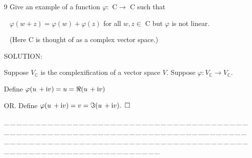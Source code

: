 \documentclass[a4paper, 11pt, UTF8]{article}
\def\i{\textup{i}}
\begin{document}
\begin{large}
{\timesbf\Large 9} {\timessl\Large 
Give an example of a function $\varphi:$ {\timesbf C}$\rightarrow$ {\timesbf C} such that}\par\,\,\,
{\timessl\Large
 $\varphi(w + z) = \varphi(w) + \varphi(z)$ for all $w, z\in$ {\timesbf C} but $\varphi$ is not linear.}\par\,\,\,
{\timessl (Here {\timesbf C} is thought of as a complex vector space.)
}\par
{\timesbf S\footnotesize{OLUTION:}}\par\quad
Suppose $V_\mathbb{C}$ is the complexification of a vector space $V$. Suppose $\varphi:V_\mathbb{C}\rightarrow V_\mathbb{C}.$\par\quad
Define $\varphi(u\,+\i v)=u=\Re(u\,+\i v)$\par\quad
O{\small R}. Define $\varphi(u\,+\i v)=v=\Im(u\,+\i v).\,\,\,\square$\par
{\tiny \_\,\_\,\_\,\_\,\_\,\_\,\_\,\_\,\_\,\_\,\_\,\_\,\_\,\_\,\_\,\_\,\_\,\_\,\_\,\_\,\_\,\_\,\_\,\_\,\_\,\_\,\_\,\_\,\_\,\_\,\_\,\_\,\_\,\_\,\_\,\_\,\_\,\_\,\_\,\_\,\_\,\_\,\_\,\_\,\_\,\_\,\_\,\_\,\_\,\_\,\_\,\_\,\_\,\_\,\_\,\_\,\_\,\_\,\_\,\_\,\_\,\_\,\_\,\_\,\_\,\_\,\_\,\_\,\_\,\_\,\_\_\,\_\,\_\,\_\,\_\,\_\,\_\,\_\,\_\,\_\,\_\,\_\,\_\,\_\,\_\,\_\,\_\,\_\,\_\,\_\,\_\,\_\,\_\,\_\,\_\,\_\,\_\,\_\,\_\,\_\,\_\,\_\,\_\,\_\,\_\,\_\,\_\,\_\,\_\,\_\,\_\,\_\,\_\,\_\,\_\,\_\,\_\,\_\,\_\,\_\,\_\,\_\,\_\,\_\,\_\,\_\,\_\,\_\,\_\,\_\,\_\,\_\,\_\,\_\,\_\,\_\,\_\,\_\,\_\,\_\,\_}\par


\end{large}
\end{document}
